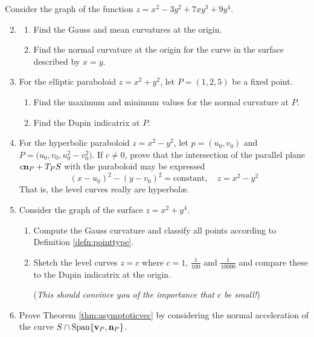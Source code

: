 \begin{exercises}{}{}
	\exstart Consider the graph of the function $z=x^2-3y^2+7xy^3+9y^4$.
	\begin{enumerate}\setcounter{enumi}{1}
	  \item[]\begin{enumerate}
	  	\item Find the Gauss and mean curvatures at the origin.
	  	\item Find the normal curvature at the origin for the curve in the surface described by $x=y$.
	  \end{enumerate}
	  
	  
	  \item For the elliptic paraboloid $z=x^2+y^2$, let $P=(1,2,5)$ be a fixed point.
	  \begin{enumerate}
	    \item Find the maximum and minimum values for the normal curvature at $P$.
	    \item Find the Dupin indicatrix at $P$.
	  \end{enumerate}
	  
	  
	  \item For the hyperbolic paraboloid $z=x^2-y^2$, let $p=(u_0,v_0)$ and $P=\bigl(u_0,v_0,u_0^2-v_0^2\bigr)$. If $c\neq 0$, prove that the intersection of the parallel plane $c{\mathbf{n}}_P+T_PS$ with the paraboloid may be expressed
	  \[
	  	(x-u_0)^2-(y-v_0)^2=\text{constant},\quad z=x^2-y^2
	  \]
	  That is, the level curves really are hyperbolæ.
	
	
		\item Consider the graph of the surface $z=x^2+y^4$.
		\begin{enumerate}
		  \item Compute the Gauss curvature and classify all points according to Definition \ref{defn:pointtype}.
		  \item Sketch the level curves $z=c$ where $c=1$, $\frac 1{100}$ and $\frac 1{10000}$ and compare these to the Dupin indicatrix at the origin.\par
		  (\emph{This should convince you of the importance that $c$ be small!})
		\end{enumerate}
		
		
		\item Prove Theorem \ref{thm:asymptoticvec} by considering the normal acceleration of the curve $S\cap\operatorname{Span}\{{\mathbf{v}}_P,{\mathbf{n}}_P\}$.
		
	\end{enumerate}
\end{exercises}


